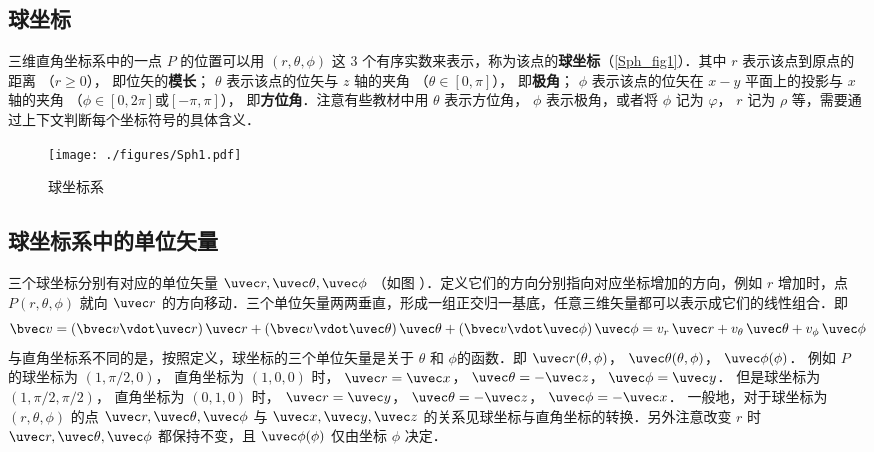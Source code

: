 

\subsection{球坐标}

三维直角坐标系中的一点 $P$ 的位置可以用 $(r,\theta ,\phi )$ 这 3 个有序实数来表示，称为该点的\textbf{球坐标}（\autoref{Sph_fig1}）．其中 $r$ 表示该点到原点的距离 （$r \geqslant 0$）， 即位矢的\textbf{模长}； $\theta$ 表示该点的位矢与 $z$ 轴的夹角 （$\theta  \in [0,\pi]$）， 即\textbf{极角}； $\phi$ 表示该点的位矢在 $x - y$ 平面上的投影与 $x$ 轴的夹角 （$\phi  \in [0,2\pi]\text{或}[- \pi,\pi]$）， 即\textbf{方位角}．注意有些教材中用 $\theta $ 表示方位角， $\phi $ 表示极角，或者将 $\phi $ 记为 $\varphi $，  $r$ 记为 $\rho $ 等，需要通过上下文判断每个坐标符号的具体含义．

\begin{figure}[ht]
\centering
\texttt{[image: ./figures/Sph1.pdf]}
\caption{球坐标系}\label{Sph_fig1}
\end{figure}

\subsection{球坐标系中的单位矢量}
三个球坐标分别有对应的单位矢量 $\uvec r, \uvec\theta, \uvec\phi$ （如图%
）．定义它们的方向分别指向对应坐标增加的方向，例如 $r$ 增加时，点 $P(r,\theta ,\phi )$ 就向 $\uvec r$ 的方向移动．三个单位矢量两两垂直，形成一组正交归一基底，任意三维矢量都可以表示成它们的线性组合．即
\begin{equation}
\bvec v = (\bvec v \vdot \uvec r)\,\uvec r + (\bvec v \vdot \uvec \theta)\,\uvec \theta  + (\bvec v \vdot \uvec \phi)\,\uvec \phi  = v_r \,\uvec r + v_\theta \,\uvec \theta  + v_\phi \,\uvec \phi 
\end{equation}
与直角坐标系不同的是，按照定义，球坐标的三个单位矢量是关于 $\theta$ 和 $\phi$的函数．即
$\uvec r(\theta ,\phi )$，  $\uvec \theta (\theta ,\phi )$，  $\uvec \phi (\phi )$． 
例如 $P$ 的球坐标为 $(1, \pi/2, 0)$， 直角坐标为 $(1, 0, 0)$ 时，
$\uvec r = \uvec x$， $\uvec \theta  =  - \uvec z$， $\uvec \phi  = \uvec y$． 
但是球坐标为 $(1, \pi/2, \pi/2)$， 直角坐标为 $(0, 1, 0)$ 时， $\uvec r = \uvec y$， $\uvec \theta  =  - \uvec z$， $\uvec \phi  =  - \uvec x$． 
一般地，对于球坐标为 $(r, \theta , \phi )$ 的点 $\uvec r, \uvec \theta, \uvec \phi$  与 $\uvec x, \uvec y, \uvec z$ 的关系见球坐标与直角坐标的转换．另外注意改变 $r$ 时 $\uvec r, \uvec \theta, \uvec \phi$ 都保持不变，且 $\uvec \phi (\phi )$ 仅由坐标 $\phi $ 决定．

